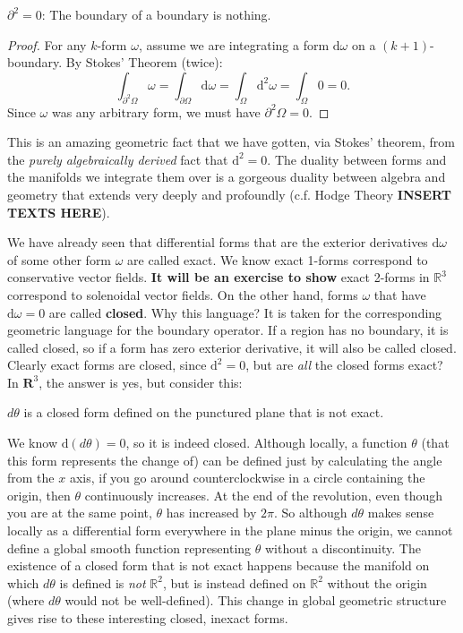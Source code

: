 \documentclass[../master.tex]{subfiles}
\begin{document}
	\begin{cor}
		$\partial^2 = 0$: The boundary of a boundary is nothing. 
	\end{cor}
	\begin{proof}
		For any $k$-form $\omega$, assume we are integrating a form $\mathrm d \omega$ on a $(k+1)$-boundary. By Stokes' Theorem (twice):
		\begin{equation*}
			\int_{\partial^2 \Omega} \omega = \int_{\partial \Omega} \mathrm d \omega = \int_{\Omega} \mathrm d^2 \omega = \int_\Omega 0 = 0.
		\end{equation*}
		Since $\omega$ was any arbitrary form, we must have $\partial^2 \Omega = 0$.
	\end{proof}
	This is an amazing geometric fact that we have gotten, via Stokes' theorem, from the \emph{purely algebraically derived} fact that $\mathrm d^2 = 0$. The duality between forms and the manifolds we integrate them over is a gorgeous duality between algebra and geometry that extends very deeply and profoundly (c.f. Hodge Theory \textbf{INSERT TEXTS HERE}).
	
	We have already seen that differential forms that are the exterior derivatives $\mathrm d \omega$ of some other form $\omega$ are called exact. We know exact 1-forms correspond to conservative vector fields. \textbf{It will be an exercise to show} exact 2-forms in $\mathbb R^3$ correspond to solenoidal vector fields. On the other hand, forms $\omega$ that have $\mathrm d \omega = 0$ are called \textbf{closed}. Why this language? It is taken for the corresponding geometric language for the boundary operator. If a region has no boundary, it is called closed, so if a form has zero exterior derivative, it will also be called closed. Clearly exact forms are closed, since $\mathrm d^2 = 0$, but are \emph{all} the closed forms exact? In $\mathbf{R}^3$, the answer is yes, but consider this:
	
	\begin{example}
		$d\theta$ is a closed form defined on the punctured plane that is not exact. 
	\end{example}
	
	We know $\mathrm d (d\theta) = 0$, so it is indeed closed. Although locally, a function $\theta$ (that this form represents the change of) can be defined just by calculating the angle from the $x$ axis, if you go around counterclockwise in a circle containing the origin, then $\theta$ continuously increases. At the end of the revolution, even though you are at the same point, $\theta$ has increased by $2\pi$. So although $d\theta$ makes sense locally as a differential form everywhere in the plane minus the origin, we cannot define a global smooth function representing $\theta$ without a discontinuity. The existence of a closed form that is not exact happens because the manifold on which $d\theta$ is defined is \emph{not} $\mathbb R^2$, but is instead defined on $\mathbb{R}^2$ without the origin (where $d\theta$ would not be well-defined). This change in global geometric structure gives rise to these interesting closed, inexact forms. 
	
\end{document}
